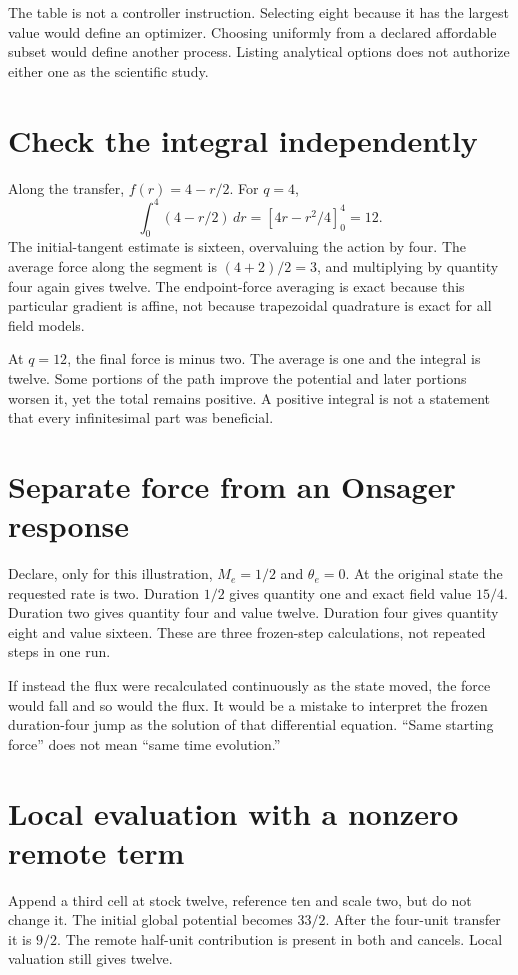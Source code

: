 The table is not a controller instruction. Selecting eight because it has
the largest value would define an optimizer. Choosing uniformly from a
declared affordable subset would define another process. Listing analytical
options does not authorize either one as the scientific study.

\section{Check the integral independently}
Along the transfer, $f(r)=4-r/2$. For $q=4$,
\begin{equation}
 \int_0^4(4-r/2)\,dr=[4r-r^2/4]_0^4=12.
\end{equation}
The initial-tangent estimate is sixteen, overvaluing the action by four.
The average force along the segment is $(4+2)/2=3$, and multiplying by
quantity four again gives twelve. The endpoint-force averaging is exact
because this particular gradient is affine, not because trapezoidal
quadrature is exact for all field models.

At $q=12$, the final force is minus two. The average is one and the
integral is twelve. Some portions of the path improve the potential and
later portions worsen it, yet the total remains positive. A positive
integral is not a statement that every infinitesimal part was beneficial.

\section{Separate force from an Onsager response}
Declare, only for this illustration, $M_e=1/2$ and $\theta_e=0$.
At the original state the requested rate is two. Duration $1/2$ gives
quantity one and exact field value $15/4$. Duration two gives quantity
four and value twelve. Duration four gives quantity eight and value sixteen.
These are three frozen-step calculations, not repeated steps in one run.

If instead the flux were recalculated continuously as the state moved,
the force would fall and so would the flux. It would be a mistake to
interpret the frozen duration-four jump as the solution of that differential
equation. ``Same starting force'' does not mean ``same time evolution.''

\section{Local evaluation with a nonzero remote term}
Append a third cell at stock twelve, reference ten and scale two, but do
not change it. The initial global potential becomes $33/2$. After the
four-unit transfer it is $9/2$. The remote half-unit contribution is
present in both and cancels. Local valuation still gives twelve.

